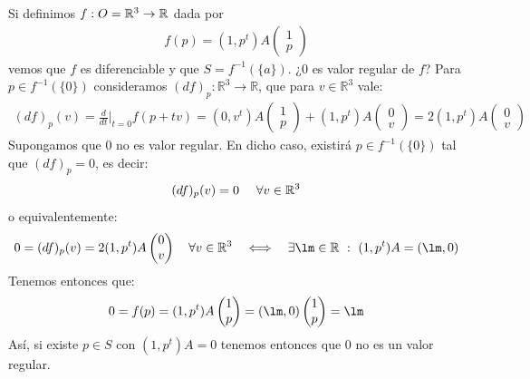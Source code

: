 \begin{ejemplo}
\begin{enumerate}
        Si definimos $f:O=\mathbb{R}^3 \to \mathbb{R}$ dada por 
        \begin{gather*}
            f(p) =  \left(1,p^t\right)A \begin{pmatrix} 1\\p\end{pmatrix}
        \end{gather*}
        vemos que $f$ es diferenciable y que $S = f^{-1}(\{a\})$. ¿$0$ es valor regular de $f$? Para $p\in f^{-1}(\{0\})$ consideramos $(d f)_p:\mathbb{R}^3\to\mathbb{R}$, que para $v\in \mathbb{R} ^3$ vale:
        \begin{gather*}
            (df)_p(v) = \frac{d}{dt}\big|_{t=0}f(p+tv) =  (0,v^t)A\begin{pmatrix} 1\\p\end{pmatrix} + (1,p^t)A\begin{pmatrix} 0\\v\end{pmatrix} = 2(1,p^t)A\begin{pmatrix} 0\\v\end{pmatrix}
        \end{gather*}
        Supongamos que $0$ no es valor regular. En dicho caso, existirá $p\in f^{-1}(\{0\})$ tal que $(df)_p = 0$, es decir:
        \begin{gather*}
            (df)_p(v) = 0 \ \ \ \ \forall v \in \mathbb{R}^3
        \end{gather*}
        o equivalentemente:
        \begin{equation*}
            0=(d f)_p(v) = 2(1,p^t)A \begin{pmatrix} 0\\v\end{pmatrix}\quad \forall v\in \mathbb{R}^3 \quad\Longleftrightarrow\quad \exists \lm\in \mathbb{R}~:~ (1,p^t)A = (\lm, 0)
        \end{equation*}
        Tenemos entonces que:
        \begin{equation*}
            0 = f(p) = (1,p^t)A \begin{pmatrix} 1\\p\end{pmatrix} = (\lm, 0)\begin{pmatrix} 1\\p\end{pmatrix} = \lm
        \end{equation*}
        Así, si existe $p\in S$ con $(1,p^t)A = 0$ tenemos entonces que $0$ no es un valor regular.


\end{enumerate}
\end{ejemplo}
